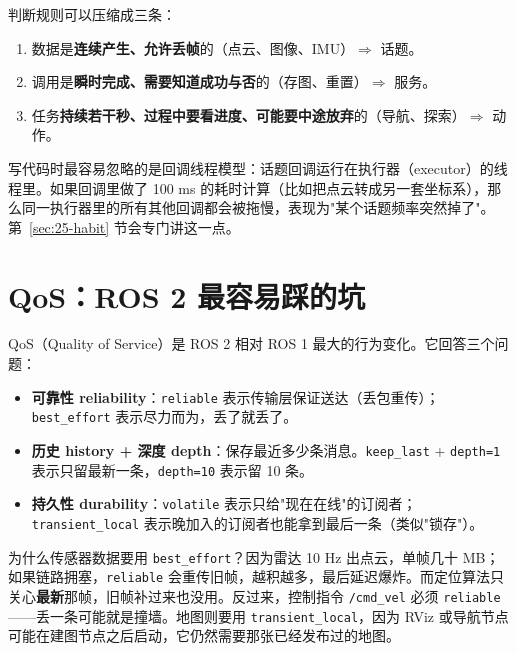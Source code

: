 判断规则可以压缩成三条：

\begin{enumerate}
  \item 数据是\textbf{连续产生、允许丢帧}的（点云、图像、IMU）$\Rightarrow$ 话题。
  \item 调用是\textbf{瞬时完成、需要知道成功与否}的（存图、重置）$\Rightarrow$ 服务。
  \item 任务\textbf{持续若干秒、过程中要看进度、可能要中途放弃}的（导航、探索）$\Rightarrow$ 动作。
\end{enumerate}

写代码时最容易忽略的是回调线程模型：话题回调运行在执行器（executor）的线程里。如果回调里做了 100 ms 的耗时计算（比如把点云转成另一套坐标系），那么同一执行器里的所有其他回调都会被拖慢，表现为"某个话题频率突然掉了"。第~\ref{sec:25-habit} 节会专门讲这一点。

\section{QoS：ROS 2 最容易踩的坑}\label{sec:25-qos}

QoS（Quality of Service）是 ROS 2 相对 ROS 1 最大的行为变化。它回答三个问题：

\begin{itemize}
  \item \textbf{可靠性 reliability}：\lstinline{reliable} 表示传输层保证送达（丢包重传）；\lstinline{best_effort} 表示尽力而为，丢了就丢了。
  \item \textbf{历史 history + 深度 depth}：保存最近多少条消息。\lstinline{keep_last} + \lstinline{depth=1} 表示只留最新一条，\lstinline{depth=10} 表示留 10 条。
  \item \textbf{持久性 durability}：\lstinline{volatile} 表示只给"现在在线"的订阅者；\lstinline{transient_local} 表示晚加入的订阅者也能拿到最后一条（类似"锁存"）。
\end{itemize}

为什么传感器数据要用 \lstinline{best_effort}？因为雷达 10 Hz 出点云，单帧几十 MB；如果链路拥塞，\lstinline{reliable} 会重传旧帧，越积越多，最后延迟爆炸。而定位算法只关心\textbf{最新}那帧，旧帧补过来也没用。反过来，控制指令 \lstinline{/cmd_vel} 必须 \lstinline{reliable}——丢一条可能就是撞墙。地图则要用 \lstinline{transient_local}，因为 RViz 或导航节点可能在建图节点之后启动，它仍然需要那张已经发布过的地图。

